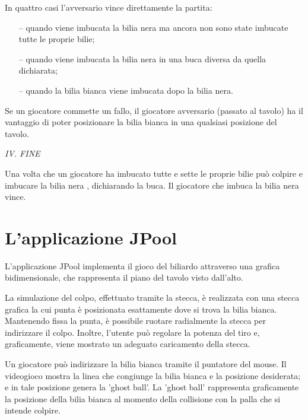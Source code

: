 \documentclass[12pt,a4paper]{report}
\begin{document}
\pagebreak
In quattro casi l'avversario vince direttamente la partita:
\begin{itemize}[noitemsep]
    \item[--] quando viene imbucata la bilia nera ma ancora non sono state imbucate tutte le proprie bilie;
    \item[--] quando viene imbucata la bilia nera in una buca diversa da quella dichiarata;
    \item[--] quando la bilia bianca viene imbucata dopo la bilia nera.
\end{itemize}

Se un giocatore commette un fallo, il giocatore avversario (passato al tavolo) ha il vantaggio di poter posizionare la bilia bianca in una qualsiasi posizione del tavolo.

\vspace{9mm}
\noindent \emph{IV. FINE}

Una volta che un giocatore ha imbucato tutte e sette le proprie bilie può colpire e imbucare la bilia nera , dichiarando la buca.
Il giocatore che imbuca la bilia nera vince.

\section{L'applicazione JPool}\label{se:JPool} %
L'applicazione JPool implementa il gioco del biliardo attraverso una grafica bidimensionale, che rappresenta il piano del tavolo visto dall'alto.

\vspace{3mm}

La simulazione del colpo, effettuato tramite la stecca, è realizzata con una stecca grafica la cui punta è posizionata esattamente dove si trova la bilia bianca.
Mantenendo fissa la punta, è possibile ruotare radialmente la stecca per indirizzare il colpo.
Inoltre, l'utente può regolare la potenza del tiro e, graficamente, viene mostrato un adeguato caricamento della stecca.

\vspace{3mm}

Un giocatore può indirizzare la bilia bianca tramite il puntatore del mouse.
Il videogioco mostra la linea che congiunge la bilia bianca e la posizione desiderata; e in tale posizione genera la 'ghost ball'.
La 'ghost ball' rappresenta graficamente la posizione della bilia bianca al momento della collisione con la palla che si intende colpire.

\vspace{3mm}
\end{document}
